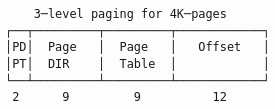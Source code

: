 \documentclass[varwidth=25em]{standalone}
\begin{document}
\begin{verbatim}
    3─level paging for 4K─pages
┌──┬─────────┬─────────┬────────────┐
│PD│  Page   │  Page   │   Offset   │
│PT│  DIR    │  Table  │            │
└──┴─────────┴─────────┴────────────┘
 2      9         9          12
\end{verbatim}
\end{document}
